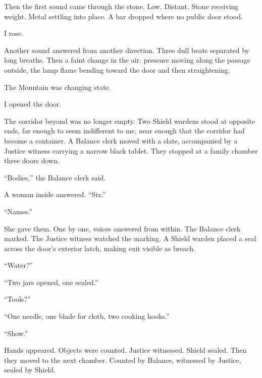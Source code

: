 Then the first sound came through the stone. Low. Distant. Stone receiving weight. Metal settling into place. A bar dropped where no public door stood.\par

I rose.\par

Another sound answered from another direction. Three dull beats separated by long breaths. Then a faint change in the air: pressure moving along the passage outside, the lamp flame bending toward the door and then straightening.\par

The Mountain was changing state.\par

I opened the door.\par

The corridor beyond was no longer empty. Two Shield wardens stood at opposite ends, far enough to seem indifferent to me, near enough that the corridor had become a container. A Balance clerk moved with a slate, accompanied by a Justice witness carrying a narrow black tablet. They stopped at a family chamber three doors down.\par

``Bodies,'' the Balance clerk said.\par

A woman inside answered. ``Six.''\par

``Names.''\par

She gave them. One by one, voices answered from within. The Balance clerk marked. The Justice witness watched the marking. A Shield warden placed a seal across the door's exterior latch, making exit visible as breach.\par

``Water?''\par

``Two jars opened, one sealed.''\par

``Tools?''\par

``One needle, one blade for cloth, two cooking hooks.''\par

``Show.''\par

Hands appeared. Objects were counted. Justice witnessed. Shield sealed. Then they moved to the next chamber. Counted by Balance, witnessed by Justice, sealed by Shield.\par

